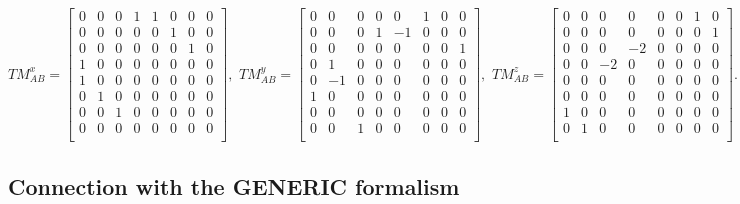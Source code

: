 \documentclass[a4paper, amsfonts, amssymb, amsmath, reprint, showkeys, nofootinbib, twoside, onecolumn,notitlepage]{revtex4-1}
\begin{document}
\begin{equation}
TM^x_{AB}= 
\begin{bmatrix}
0 & 0 & 0 & 1 & 1 & 0 & 0 & 0  \\
0 & 0 & 0 & 0 & 0 & 1 & 0 & 0  \\
0 & 0 & 0 & 0 & 0 & 0 & 1 & 0  \\
1 & 0 & 0 & 0 & 0 & 0 & 0 & 0  \\
1 & 0 & 0 & 0 & 0 & 0 & 0 & 0  \\
0 & 1 & 0 & 0 & 0 & 0 & 0 & 0  \\
0 & 0 & 1 & 0 & 0 & 0 & 0 & 0  \\
0 & 0 & 0 & 0 & 0 & 0 & 0 & 0  \\
\end{bmatrix} ,
\, \,  
TM^y_{AB}= 
\begin{bmatrix}
0 & 0 & 0 & 0 & 0 & 1 & 0 & 0  \\
0 & 0 & 0 & 1 & -1 & 0 & 0 & 0  \\
0 & 0 & 0 & 0 & 0 & 0 & 0 & 1  \\
0 & 1 & 0 & 0 & 0 & 0 & 0 & 0  \\
0 & -1 & 0 & 0 & 0 & 0 & 0 & 0  \\
1 & 0 & 0 & 0 & 0 & 0 & 0 & 0  \\
0 & 0 & 0 & 0 & 0 & 0 & 0 & 0  \\
0 & 0 & 1 & 0 & 0 & 0 & 0 & 0  \\
\end{bmatrix} ,
\, \,
TM^z_{AB}= 
\begin{bmatrix}
0 & 0 & 0 & 0 & 0 & 0 & 1 & 0  \\
0 & 0 & 0 & 0 & 0 & 0 & 0 & 1  \\
0 & 0 & 0 & -2 & 0 & 0 & 0 & 0  \\
0 & 0 & -2 & 0 & 0 & 0 & 0 & 0  \\
0 & 0 & 0 & 0 & 0 & 0 & 0 & 0  \\
0 & 0 & 0 & 0 & 0 & 0 & 0 & 0  \\
1 & 0 & 0 & 0 & 0 & 0 & 0 & 0  \\
0 & 1 & 0 & 0 & 0 & 0 & 0 & 0  \\
\end{bmatrix} .
\end{equation}

\subsection{Connection with the GENERIC formalism}
\end{document}
